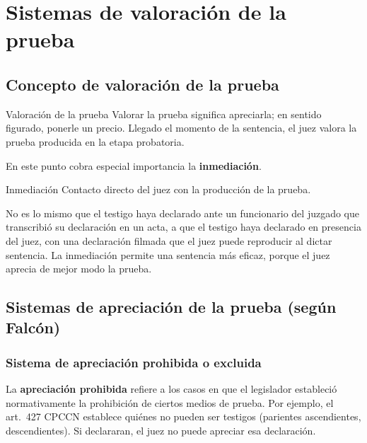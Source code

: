 \documentclass[12pt,oneside]{book}
\begin{document}
\chapter[Valoración de la prueba]{Sistemas de valoración de la prueba}\label{cap:valoracion}


\section{Concepto de valoración de la prueba}

\begin{definition}{Valoración de la prueba}
Valorar la prueba significa apreciarla; en sentido figurado, ponerle un precio. Llegado el momento de la sentencia, el juez valora la prueba producida en la etapa probatoria.
\end{definition}

En este punto cobra especial importancia la \textbf{inmediación}.

\begin{definition}{Inmediación}
Contacto directo del juez con la producción de la prueba.
\end{definition}

No es lo mismo que el testigo haya declarado ante un funcionario del juzgado que transcribió su declaración en un acta, a que el testigo haya declarado en presencia del juez, con una declaración filmada que el juez puede reproducir al dictar sentencia. La inmediación permite una sentencia más eficaz, porque el juez aprecia de mejor modo la prueba.

\section{Sistemas de apreciación de la prueba (según Falcón)}

\subsection{Sistema de apreciación prohibida o excluida}

La \textbf{apreciación prohibida} refiere a los casos en que el legislador estableció normativamente la prohibición de ciertos medios de prueba. Por ejemplo, el art.~427 CPCCN establece quiénes no pueden ser testigos (parientes ascendientes, descendientes). Si declararan, el juez no puede apreciar esa declaración.
\end{document}
